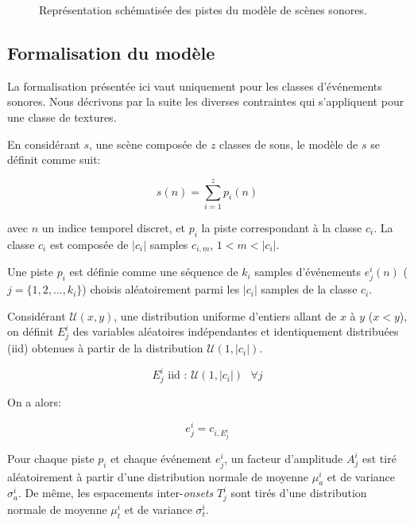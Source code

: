 \begin{figure}[t]
        \graphicspath{{gfx/ch_4/}}
        \myfloatalign
        \def\svgwidth{\linewidth}
        
       \caption{Représentation schématisée des pistes du modèle de scènes sonores.}\label{fig:modelSequence}
\end{figure}


\subsection{Formalisation du modèle}
 \label{sec:ch4_modelForm}
 
La formalisation présentée ici vaut uniquement pour les classes d'événements sonores. Nous décrivons par la suite les diverses contraintes qui s'appliquent pour une classe de textures.
 
En considérant $s$, une scène composée de $z$ classes de sons, le modèle de $s$ se définit comme suit:
 
 \begin{equation}
 s(n)=\sum_{i=1}^{z}p_i(n)
 \end{equation}

avec $n$ un indice temporel discret, et $p_i$ la piste correspondant à la classe $c_i$. La classe $c_i$ est composée de $\vert c_i\vert$ samples $c_{i,m}$, $1<m<\vert c_i\vert$. 

Une piste $p_i$ est définie comme une séquence de $k_i$ samples d'événements $e_j^i(n)$ ($j=\lbrace 1,2,\ldots,k_i\rbrace$) choisis aléatoirement parmi les $\vert c_i\vert$ samples de la classe $c_i$. 

Considérant $\mathcal{U}(x,y)$, une distribution uniforme d'entiers allant de $x$ à $y$ ($x<y$), on définit $E_j^i$ des variables aléatoires indépendantes et identiquement distribuées (iid) obtenues à partir de la distribution $\mathcal{U}(1,\vert c_i \vert)$.

\begin{equation}
E_j^i \textrm{ iid : } \mathcal{U}(1,\vert c_i \vert) \textrm{ } \forall j 
\end{equation}

On a alors:

\begin{equation}
e_j^i=c_{i,E_j^i}
\end{equation}

Pour chaque piste $p_i$ et chaque événement $e_j^i$, un facteur d'amplitude $A_j^i$ est tiré aléatoirement à partir d'une distribution normale de moyenne $\mu_a^i$ et de variance $\sigma_a^i$. De même, les espacements inter-\emph{onsets} $T_j^i$ sont tirés d'une distribution normale de moyenne $\mu_t^i$ et de variance $\sigma_t^i$. 

